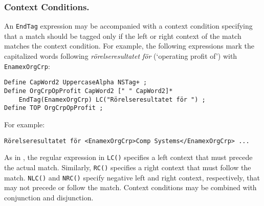 \documentclass{llncs}
\begin{document}
\subsubsection{Context Conditions.}

An \texttt{EndTag} expression may be accompanied with a context
condition specifying that a match should be tagged only if the
left or right context of the match matches the context condition. For
example, the
following expressions mark the capitalized words following
\textit{rörelseresultatet för} (`operating profit of') with
\texttt{EnamexOrgCrp}:

\begin{verbatim}
Define CapWord2 UppercaseAlpha NSTag+ ;
Define OrgCrpOpProfit CapWord2 [" " CapWord2]*
    EndTag(EnamexOrgCrp) LC("Rörelseresultatet för ") ;
Define TOP OrgCrpOpProfit ;
\end{verbatim}

\noindent
For example:
\begin{verbatim}
Rörelseresultatet för <EnamexOrgCrp>Comp Systems</EnamexOrgCrp> ...
\end{verbatim}

As in \cite{karttunen/2011}, the regular expression in \texttt{LC()}
specifies a left context that must precede the actual match.
Similarly, \texttt{RC()}
specifies a right context that must follow the match. \texttt{NLC()}
and \texttt{NRC()} specify negative left and right context,
respectively, that may not precede or follow the match.
Context conditions may be combined with conjunction and disjunction.




\end{document}
